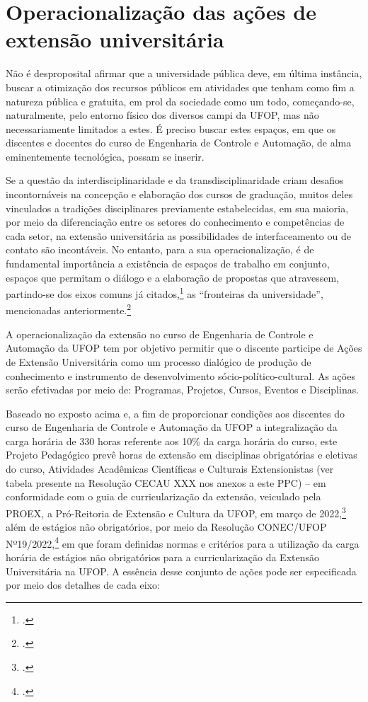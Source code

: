\documentclass[
	12pt,				%
	openright,			%
	oneside,			%
	a4paper,			%
	english,			%
	brazil				%
	]{abntex2}
\begin{document}
\section{Operacionalização das ações de extensão universitária}
%
Não é desproposital afirmar que a universidade pública deve, em última instância, buscar a otimização dos recursos públicos em atividades que tenham como fim a natureza pública e gratuita, em prol da sociedade como um todo, começando-se, naturalmente, pelo entorno físico dos diversos campi da UFOP, mas não necessariamente limitados a estes. É preciso buscar estes espaços, em que os discentes e docentes do curso de Engenharia de Controle e Automação, de alma eminentemente tecnológica, possam se inserir.

Se a questão da interdisciplinaridade e da transdisciplinaridade criam desafios incontornáveis na concepção e elaboração dos cursos de graduação, muitos deles vinculados a tradições disciplinares previamente estabelecidas, em sua maioria, por meio da diferenciação entre os setores do conhecimento e competências de cada setor, na extensão universitária as possibilidades de interfaceamento ou de contato são incontáveis. No entanto, para a sua operacionalização, é de fundamental importância a existência de espaços de trabalho em conjunto, espaços que permitam o diálogo e a elaboração de propostas que atravessem, partindo-se dos eixos comuns já citados,\footcite[Ver, por exemplo, o capítulo 3 da política de formação para os cursos de engenharia, em que tais eixos são justamente especificados. ver em][p.~13]{politica-eng-2022-ufop} as ``fronteiras da universidade'', mencionadas anteriormente.\footcite[Ver também][]{varellaetal2022}

A operacionalização da extensão no curso de Engenharia de Controle e Automação da UFOP tem por objetivo permitir que o discente participe de Ações de Extensão Universitária como um processo dialógico de produção de conhecimento e instrumento de desenvolvimento sócio-político-cultural. As ações serão efetivadas por meio de: Programas, Projetos, Cursos, Eventos e Disciplinas.

Baseado no exposto acima e, a fim de proporcionar condições aos discentes do curso de Engenharia de Controle e Automação da UFOP a integralização da carga horária de 330 horas referente aos 10\% da carga horária do curso, este Projeto Pedagógico prevê horas de extensão em disciplinas obrigatórias e eletivas do curso, Atividades Acadêmicas Científicas e Culturais Extensionistas (ver tabela presente na Resolução CECAU XXX nos anexos a este PPC) -- em conformidade com o guia de curricularização da extensão, veiculado pela PROEX, a Pró-Reitoria de Extensão e Cultura da UFOP, em março de 2022,\footcite[Ver em][]{guia-curricularizacao-2022} além de estágios não obrigatórios, por meio da Resolução CONEC/UFOP Nº19/2022,\footcite{CONEC-UFOP-19-2022} em que foram definidas normas e critérios para a utilização da carga horária de estágios não obrigatórios para a curricularização da Extensão Universitária na UFOP. A essência desse conjunto de ações pode ser especificada por meio dos detalhes de cada eixo:
\end{document}
